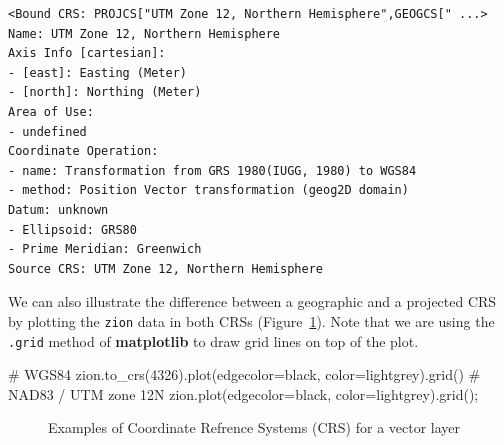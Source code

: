 \documentclass[
  letterpaper,
]{krantz}
\newenvironment{Shaded}{\begin{snugshade}}{\end{snugshade}}
\newcommand{\CommentTok}[1]{\textcolor[rgb]{0.37,0.37,0.37}{#1}}
\newcommand{\DecValTok}[1]{\textcolor[rgb]{0.68,0.00,0.00}{#1}}
\newcommand{\NormalTok}[1]{\textcolor[rgb]{0.00,0.23,0.31}{#1}}
\newcommand{\OperatorTok}[1]{\textcolor[rgb]{0.37,0.37,0.37}{#1}}
\newcommand{\StringTok}[1]{\textcolor[rgb]{0.13,0.47,0.30}{#1}}
\begin{document}
\begin{verbatim}
<Bound CRS: PROJCS["UTM Zone 12, Northern Hemisphere",GEOGCS[" ...>
Name: UTM Zone 12, Northern Hemisphere
Axis Info [cartesian]:
- [east]: Easting (Meter)
- [north]: Northing (Meter)
Area of Use:
- undefined
Coordinate Operation:
- name: Transformation from GRS 1980(IUGG, 1980) to WGS84
- method: Position Vector transformation (geog2D domain)
Datum: unknown
- Ellipsoid: GRS80
- Prime Meridian: Greenwich
Source CRS: UTM Zone 12, Northern Hemisphere
\end{verbatim}

We can also illustrate the difference between a geographic and a
projected CRS by plotting the \texttt{zion} data in both CRSs
(Figure~\ref{fig-zion-crs}). Note that we are using the \texttt{.grid}
method of \textbf{matplotlib} to draw grid lines on top of the plot.

\begin{Shaded}
\begin{Highlighting}[]
\CommentTok{\# WGS84}
\NormalTok{zion.to\_crs(}\DecValTok{4326}\NormalTok{).plot(edgecolor}\OperatorTok{=}\StringTok{\textquotesingle{}black\textquotesingle{}}\NormalTok{, color}\OperatorTok{=}\StringTok{\textquotesingle{}lightgrey\textquotesingle{}}\NormalTok{).grid()}
\CommentTok{\# NAD83 / UTM zone 12N}
\NormalTok{zion.plot(edgecolor}\OperatorTok{=}\StringTok{\textquotesingle{}black\textquotesingle{}}\NormalTok{, color}\OperatorTok{=}\StringTok{\textquotesingle{}lightgrey\textquotesingle{}}\NormalTok{).grid()}\OperatorTok{;}
\end{Highlighting}
\end{Shaded}

\begin{figure}

\begin{minipage}{0.50\linewidth}



\end{minipage}%
%
\begin{minipage}{0.50\linewidth}



\end{minipage}%

\caption{\label{fig-zion-crs}Examples of Coordinate Refrence Systems
(CRS) for a vector layer}

\end{figure}%
\end{document}
